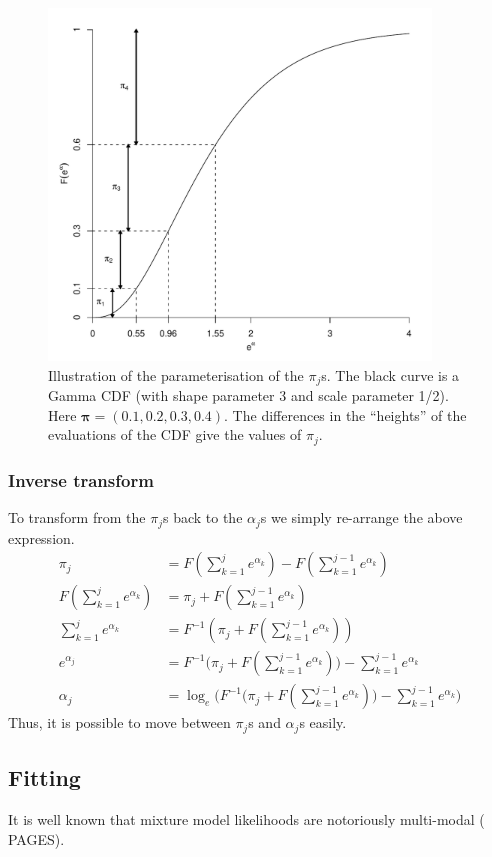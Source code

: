 \begin{figure}
\centering
\includegraphics[width=4in]{mix/figs/pidia.pdf}
\caption{Illustration of the parameterisation of the $\pi_j$s. The black curve is a Gamma CDF (with shape parameter 3 and scale parameter 1/2). Here $\bm{\pi}=(0.1,0.2,0.3,0.4)$. The differences in the ``heights'' of the evaluations of the CDF give the values of $\pi_j$.}
\label{dlbpi}
\end{figure}

\subsubsection{Inverse transform}
\label{mmds-pi-inv}
To transform from the $\pi_j$s back to the $\alpha_j$s we simply re-arrange the above expression.
\begin{align*}
\pi_j &= F(\sum_{k=1}^j e^{\alpha_k}) - F(\sum_{k=1}^{j-1} e^{\alpha_k})\\
F(\sum_{k=1}^j e^{\alpha_k}) &= \pi_j + F(\sum_{k=1}^{j-1} e^{\alpha_k})\\
\sum_{k=1}^j e^{\alpha_k} &= F^{-1}(\pi_j + F(\sum_{k=1}^{j-1} e^{\alpha_k}))\\
e^{\alpha_j} &= F^{-1}\Big(\pi_j + F(\sum_{k=1}^{j-1} e^{\alpha_k})\Big) - \sum_{k=1}^{j-1} e^{\alpha_k}\\
\alpha_j &= \log_e \Big(F^{-1}\Big(\pi_j + F(\sum_{k=1}^{j-1} e^{\alpha_k})\Big) - \sum_{k=1}^{j-1} e^{\alpha_k}\Big)
\end{align*}
Thus, it is possible to move between $\pi_j$s and $\alpha_j$s easily.

\subsection{Fitting}
It is well known that mixture model likelihoods are notoriously multi-modal (\cite{BDA} PAGES).

